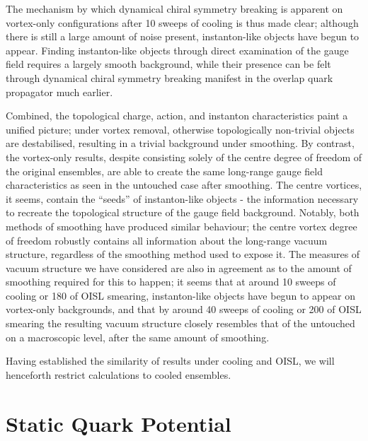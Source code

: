 \documentclass[
 reprint,
 amsmath,amssymb,
 aps,
prd,
]{revtex4-1}
\begin{document}
\par 
The mechanism by which dynamical chiral symmetry breaking is apparent on vortex-only configurations after 10 sweeps of cooling is thus made clear; although there is still a large amount of noise present, instanton-like objects have begun to appear. Finding instanton-like objects through direct examination of the gauge field requires a largely smooth background, while their presence can be felt through dynamical chiral symmetry breaking manifest in the overlap quark propagator much earlier.
\par
Combined, the topological charge, action, and instanton characteristics paint a unified picture; under vortex removal, otherwise topologically non-trivial objects are destabilised, resulting in a trivial background under smoothing. By contrast, the vortex-only results, despite consisting solely of the centre degree of freedom of the original ensembles, are able to create the same long-range gauge field characteristics as seen in the untouched case after smoothing. The centre vortices, it seems, contain the ``seeds'' of instanton-like objects - the information necessary to recreate the topological structure of the gauge field background. Notably, both methods of smoothing have produced similar behaviour; the centre vortex degree of freedom robustly contains all information about the long-range vacuum structure, regardless of the smoothing method used to expose it. The measures of vacuum structure we have considered are also in agreement as to the amount of smoothing required for this to happen; it seems that at around 10 sweeps of cooling or 180 of OISL smearing, instanton-like objects have begun to appear on vortex-only backgrounds, and that by around 40 sweeps of cooling or 200 of OISL smearing the resulting vacuum structure closely resembles that of the untouched on a macroscopic level, after the same amount of smoothing. \par
Having established the similarity of results under cooling and OISL, we will henceforth restrict calculations to cooled ensembles.

\section{Static Quark Potential}
\label{sec:SQP}
\end{document}
